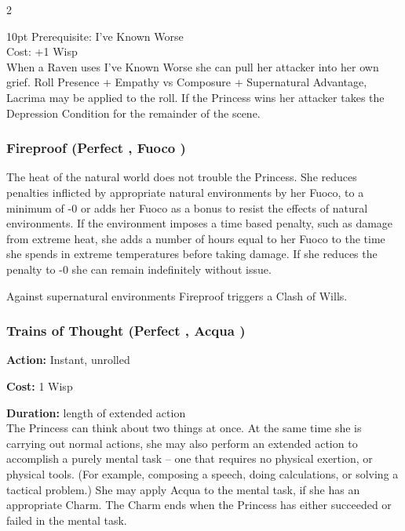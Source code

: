 \begin{multicols}{2}
\begin{myindentpar}{10pt}
\noindent Prerequisite: I've Known Worse \\

\noindent Cost: +1 Wisp \\

\noindent When a Raven uses I've Known Worse she can pull her attacker into her own grief. Roll Presence + Empathy vs Composure + Supernatural Advantage, Lacrima may be applied to the roll. If the Princess wins her attacker takes the Depression Condition for the remainder of the scene. 

\end{myindentpar}


\subsubsection*{Fireproof (Perfect \textbullet, Fuoco \textbullet)}

The heat of the natural world does not trouble the Princess. She reduces penalties inflicted by appropriate natural environments by her Fuoco, to a minimum of -0 or adds her Fuoco as a bonus to resist the effects of natural environments. If the environment imposes a time based penalty, such as damage from extreme heat, she adds a number of hours equal to her Fuoco to the time she spends in extreme temperatures before taking damage. If she reduces the penalty to -0 she can remain indefinitely without issue. 

Against supernatural environments Fireproof triggers a Clash of Wills.

\subsubsection*{Trains of Thought (Perfect \textbullet, Acqua \textbullet)}

\noindent \textbf{Action:} Instant, unrolled

\noindent \textbf{Cost:} 1 Wisp

\noindent \textbf{Duration:} length of extended action\\

\noindent The Princess can think about two things at once. At the same time she is carrying out normal actions, she may also perform an extended action to accomplish a purely mental task -- one that requires no physical exertion, or physical tools. (For example, composing a speech, doing calculations, or solving a tactical problem.) She may apply Acqua to the mental task, if she has an appropriate Charm. The Charm ends when the Princess has either succeeded or failed in the mental task.


\end{multicols}
